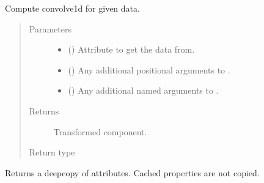 \documentclass[letterpaper,10pt,english]{sphinxmanual}
\begin{document}
\begin{fulllineitems}
\begin{fulllineitems}
\label{\detokenize{api/rock:geology.src.Rock.convolve1d}}
Compute convolve1d for given data.
\begin{quote}\begin{description}
\item[{Parameters}] \leavevmode\begin{itemize}
\item {} 
 (\sphinxstyleliteralemphasis{\sphinxupquote{, }}) \textendash{} Attribute to get the data from.

\item {} 
 () \textendash{} Any additional positional arguments to .

\item {} 
 () \textendash{} Any additional named arguments to .

\end{itemize}

\item[{Returns}] \leavevmode
{} \textendash{} Transformed component.

\item[{Return type}] \leavevmode
{\hyperref[\detokenize{api/base_classes:geology.src.base_spatial.SpatialComponent}]{}}

\end{description}\end{quote}

\end{fulllineitems}


\begin{fulllineitems}
\label{\detokenize{api/rock:geology.src.Rock.copy}}
Returns a deepcopy of attributes. Cached properties are not copied.


\end{fulllineitems}
\end{fulllineitems}
\end{document}
